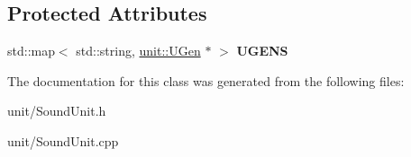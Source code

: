 \subsection*{Protected Attributes}
\begin{DoxyCompactItemize}
\item 
std\+::map$<$ std\+::string, \hyperlink{classunit_1_1UGen}{unit\+::\+U\+Gen} $\ast$ $>$ {\bfseries U\+G\+E\+NS}\hypertarget{classSoundUnit_af89c0c537f05fde2f775dcaddc09bc3e}{}\label{classSoundUnit_af89c0c537f05fde2f775dcaddc09bc3e}

\end{DoxyCompactItemize}


The documentation for this class was generated from the following files\+:\begin{DoxyCompactItemize}
\item 
unit/Sound\+Unit.\+h\item 
unit/Sound\+Unit.\+cpp\end{DoxyCompactItemize}
